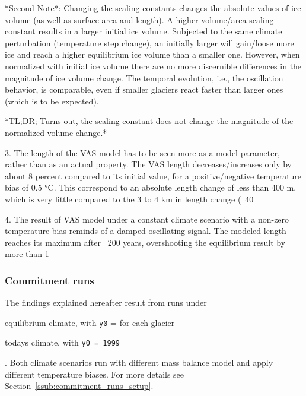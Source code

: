          *Second Note*: Changing the scaling constants changes the absolute values of ice volume (as well as surface area and length). A higher volume/area scaling constant results in a larger initial ice volume. Subjected to the same climate perturbation (temperature step change), an initially larger will gain/loose more ice and reach a higher equilibrium ice volume than a smaller one. However, when normalized with initial ice volume there are no more discernible differences in the magnitude of ice volume change. The temporal evolution, i.e., the oscillation behavior, is comparable, even if smaller glaciers react faster than larger ones (which is to be expected).

         *TL;DR; Turns out, the scaling constant does not change the magnitude of the normalized volume change.* 

      3. The length of the VAS model has to be seen more as a model parameter, rather than as an actual property. The VAS length decreases/increases only by about 8 percent compared to its initial value, for a positive/negative temperature bias of 0.5 °C. This correspond to an absolute length change of less than 400 m, which is very little compared to the 3 to 4 km in length change (~40%

      4. The result of VAS model under a constant climate scenario with a non-zero temperature bias reminds of a damped oscillating signal. The modeled length reaches its maximum after ~200 years, overshooting the equilibrium result by more than 1%

      \subsubsection{Commitment runs} %
      \label{ssub:commitment_runs_results}

        The findings explained hereafter result from runs under
        \begin{enumerate*}[label=(\alph*)]
          \item equilibrium climate, with \lstinline`y0` = \tstar{} for each glacier
          \item todays climate, with \lstinline`y0 = 1999`
        \end{enumerate*}.
        Both climate scenarios run with different mass balance model and apply different temperature biases. For more details see Section~\ref{ssub:commitment_runs_setup}.


